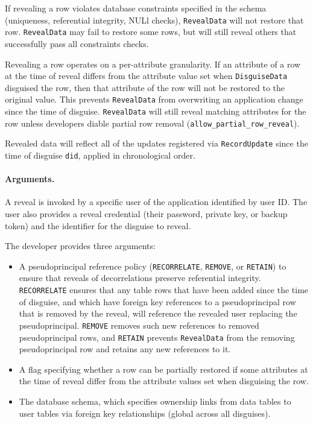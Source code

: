     If revealing a row violates database constraints specified in the schema
    (\eg uniqueness, referential integrity, NULl checks), \texttt{RevealData}
    will not restore that row.  \texttt{RevealData} may fail to restore some
    rows, but will still reveal others that successfully pass all constraints
    checks.

    Revealing a row operates on a per-attribute granularity. If an attribute of
    a row at the time of reveal differs from the attribute value set when
    \texttt{DisguiseData} disguised the row, then that attribute of the row will
    not be restored to the original value. This prevents \texttt{RevealData}
    from overwriting an application change since the time of disguise. 
    \texttt{RevealData} will still reveal matching attributes for the row unless
    developers diable partial row removal
    (\texttt{allow\_partial\_row\_reveal}).

    Revealed data will reflect all of the updates registered via
    \texttt{RecordUpdate} since the time of disguise \texttt{did}, applied in
    chronological order.

    \paragraph{Arguments.} 
    A reveal is invoked by a specific
    user of the application identified by user ID. 
    The user also provides a reveal
    credential (their password, private key, or backup token) and the 
    identifier for the disguise to reveal.

    The developer provides three arguments:
    \begin{itemize}[nosep]
    \item A pseudoprincipal reference policy (\texttt{RECORRELATE}, \texttt{REMOVE},
    or \texttt{RETAIN}) to ensure that reveals of decorrelations preserve
    referential integrity. \texttt{RECORRELATE} ensures that any table rows that
    have been added since the time of disguise, and which have foreign
    key references to a pseudoprincipal row that is removed by the reveal, will
    reference the revealed user replacing the pseudoprincipal.
    \texttt{REMOVE} removes such new references to removed pseudoprincipal rows,
    and \texttt{RETAIN} prevents \texttt{RevealData} from the removing
    pseudoprincipal row and retains any new references to it.
     
    \item A flag specifying whether a row can be partially restored if some
    attributes at the time of reveal differ from the attribute values set when
    disguising the row.

    \item The database schema, which specifies ownership links from data tables to user
    tables via foreign key relationships (global across all disguises).
    \end{itemize}

